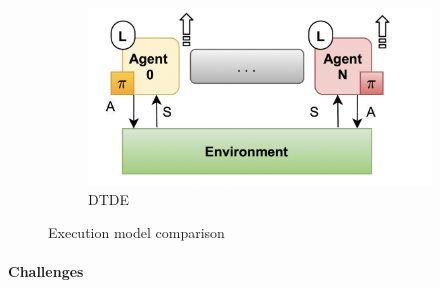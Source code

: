 \documentclass[12pt,a4paper,openright,twoside]{book}
\begin{document}
\begin{figure}[t]
\begin{subfigure}[b]{0.32\textwidth}
        \label{fig:ctde}
    \end{subfigure}
    \begin{subfigure}[b]{0.32\textwidth}
        \centering
        \includegraphics[width=\textwidth]{figures/DTDE.png}
        \caption{DTDE}
        \label{fig:dtde}
    \end{subfigure}
    \caption{Execution model comparison}\vspace{-10pt}
    \label{fig:exmod}
\end{figure}

\paragraph{Challenges}
\end{document}
